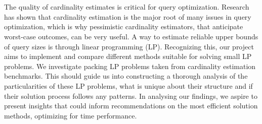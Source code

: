 \chapter{\abstractname}

The quality of cardinality estimates is critical for query optimization. Research has 
shown that cardinality estimation is the major root of many issues in 
query optimization, which is why pessimistic cardinality estimators, that
anticipate worst-case outcomes, can be very useful.
A way to estimate reliable
upper bounds of query sizes is through linear programming (LP).
Recognizing this, our project aims to implement and compare different methods suitable for solving small LP problems.
We investigate packing LP problems taken from cardinality estimation benchmarks.
This should guide us into constructing a thorough analysis of the particularities of
these LP problems, what is unique about their structure and if their solution
process follows any patterns. In analysing our findings, we aspire to present insights that could inform recommendations on the most efficient solution methods, optimizing for time performance.



